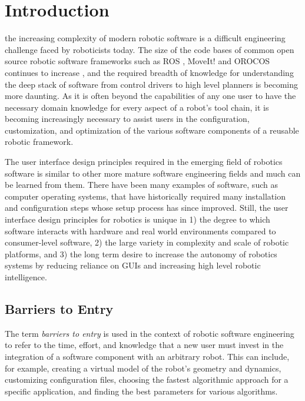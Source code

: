 \documentclass[10pt,journal,compsoc]{joser1}
\begin{document}
\section{Introduction}
 {the increasing complexity of modern robotic software
is a difficult engineering challenge faced by roboticists today. The size of the
code bases of common open source robotic software frameworks such as ROS
\cite{quigley2009ros}, MoveIt! \cite{moveit} and OROCOS
\cite{bruyninckx2001open} continues to increase \cite{makarenko2007benefits},
and the required breadth of knowledge for understanding the deep stack of
software from control drivers to high level planners is becoming more daunting.
As it is often beyond the capabilities of any one user to have the necessary
domain knowledge for every aspect of a robot's tool chain, it is becoming
increasingly necessary to assist users in the configuration, customization, and
optimization of the various software components of a reusable robotic
framework. 

The user interface design principles required in the emerging field of robotics
software is similar to other more mature software engineering fields and much
can be learned from them. There have been many examples of software, such as
computer operating systems, that have historically required many installation
and configuration steps whose setup process has since improved. Still, the user 
interface design principles for robotics is unique in 1) the degree to which software interacts with
hardware and real world environments compared to consumer-level software, 2) the large variety in complexity and
scale of robotic platforms, and 3) the long term desire to increase the autonomy
of robotics systems by reducing reliance on GUIs and increasing high level
robotic intelligence. 

\subsection{Barriers to Entry} 

The term \textit{barriers to entry} is used in the context of robotic software
engineering to refer to the time, effort, and knowledge that a new user must
invest in the integration of a software component with an arbitrary robot. This
can include, for example, creating a virtual model of the robot's geometry and
dynamics, customizing configuration files, choosing the fastest algorithmic
approach for a specific application, and finding the best parameters for various
algorithms.

}
\end{document}
